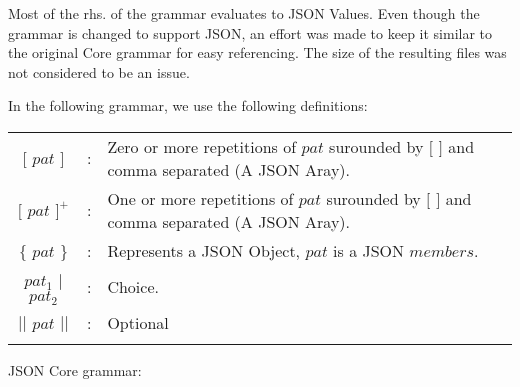 
Most of the rhs. of the grammar evaluates to JSON Values. 
Even though the grammar is changed to support JSON, an effort was made to
keep it similar to the original Core grammar for easy referencing. The size
of the resulting files was not considered to be an issue.

In the following grammar, we use the following definitions:



\begin{footnotesize}
\begin{longtable}{ c c l }


$[$ $pat$ $]$ 		& : 	& Zero or more repetitions of $pat$ surounded by $[$ $]$ and comma separated (A JSON Aray). 	\\
$[$ $pat$ $]^{+}$ 	& : 	& One or more repetitions of $pat$ surounded by $[$ $]$ and comma separated (A JSON Aray). 	\\ 
$\{$ $pat$ $\}$		& :	& Represents a JSON Object, $pat$ is a JSON $members$.						\\
$pat_{1}$ $|$ $pat_{2}$	& :	& Choice.											\\
$||$ $pat$ $||$ 	& :	& Optional											\\
\\[0.01in]

\end{longtable}
\end{footnotesize}

JSON Core grammar:

